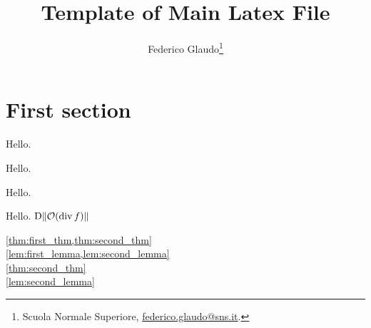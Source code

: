 \documentclass[a4paper,12pt]{article}
\title{Template of Main Latex File}
\author{Federico Glaudo\thanks{Scuola Normale Superiore, \url{federico.glaudo@sns.it}.}}
\begin{document}
 
\maketitle
\tableofcontents

\section{First section}
\begin{theorem}\label{thm:first_thm}
    Hello.
\end{theorem}
\begin{theorem}\label{thm:second_thm}
    Hello.
\end{theorem}
\begin{lemma}\label{lem:first_lemma}
    Hello.
\end{lemma}
\begin{lemma}\label{lem:second_lemma}
    Hello. $\mathrm D\lVert\mathcal{O}(\operatorname{div} f)\rVert$
\end{lemma}
\cref{thm:first_thm,thm:second_thm}\\
\cref{lem:first_lemma,lem:second_lemma}\\
\cref{thm:second_thm}\\
\cref{lem:second_lemma}

% 
% 
\end{document}
